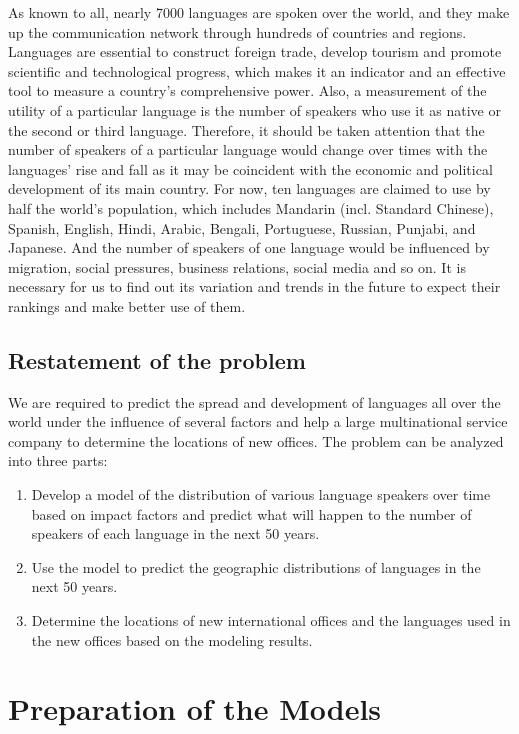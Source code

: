 \documentclass[12pt]{article}  %
\begin{document}
As known to all, nearly 7000 languages are spoken over the world, and they make up the communication network through hundreds of countries and regions. Languages are essential to construct foreign trade, develop tourism and promote scientific and technological progress, which makes it an indicator and an effective tool to measure a country’s comprehensive power. Also, a measurement of the utility of a particular language is the number of speakers who use it as native or the second or third language. Therefore, it should be taken attention that the number of speakers of a particular language would change over times with the languages’ rise and fall as it may be coincident with the economic and political development of its main country. For now, ten languages are claimed to use by half the world’s population, which includes Mandarin (incl. Standard Chinese), Spanish, English, Hindi, Arabic, Bengali, Portuguese, Russian, Punjabi, and Japanese. And the number of speakers of one language would be influenced by migration, social pressures, business relations, social media and so on. It is necessary for us to find out its variation and trends in the future to expect their rankings and make better use of them.


\subsection{Restatement of the problem}
We are required to predict the spread and development of languages all over the world under the influence of several factors and help a large multinational service company to determine the locations of new offices. The problem can be analyzed into three parts:
\begin{enumerate}[\bfseries 1.]
\item Develop a model of the distribution of various language speakers over time based on impact factors and predict what will happen to the number of speakers of each language in the next 50 years.
\item 
Use the model to predict the geographic distributions of languages in the next 50 years.
\item 
Determine the locations of new international offices and the languages used in the new offices based on the modeling results.
\end{enumerate}


\section{Preparation of the Models}
\end{document}
